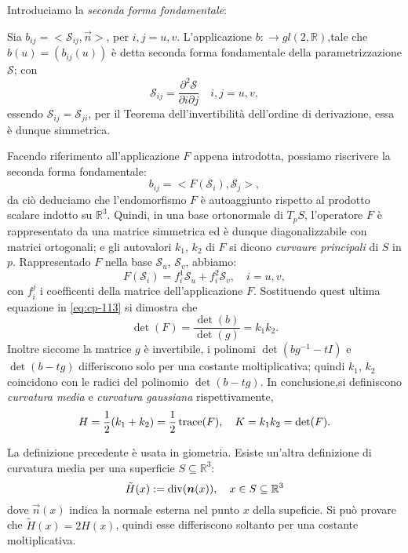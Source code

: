 Introduciamo la \emph{seconda forma fondamentale}:
\begin{definizione}
Sia $b_{ij}=<\mathcal{S}_{ij},\vec{n}>$, per $i,j=u,v$. L'applicazione $b:\longrightarrow gl(2,\mathbb{R})$,tale che $b(u)=(b_{ij}(u))$ è detta seconda forma fondamentale della parametrizzazione $\mathcal{S}$; con
\[
\mathcal{S}_{ij}=\frac{\partial^2\mathcal{S}}{\partial i\partial j}\quad i,j = u,v,
\]
essendo $\mathcal{S}_{ij}=\mathcal{S}_{ji}$, per il Teorema dell'invertibilità dell'ordine di derivazione, essa è dunque simmetrica.
\end{definizione}
Facendo riferimento all'applicazione $F$ appena introdotta, possiamo riscrivere la seconda forma fondamentale:
\begin{equation}
\label{eq:cp-113}
b_{ij}=<F(\mathcal{S}_i),\mathcal{S}_j>,
\end{equation}
da ciò deduciamo che l'endomorfismo $F$ è autoaggiunto rispetto al prodotto scalare indotto su $\mathbb{R}^3$. Quindi, in una base ortonormale di $T_pS$, l'operatore $F$ è rappresentato da una matrice simmetrica ed è dunque diagonalizzabile con matrici ortogonali; e gli autovalori $k_1$, $k_2$ di $F$ si dicono \emph{curvaure principali} di $S$ in $p$. Rappresentado $F$ nella base $\mathcal{S}_u$, $\mathcal{S}_v$, abbiamo:
\[
F(\mathcal{S}_i) = f_i^1\mathcal{S}_u + f_i^2\mathcal{S}_v,\quad i=u,v,
\]
con $f_i^j$ i coefficenti della matrice dell'applicazione $F$. Sostituendo quest ultima equazione in \eqref{eq:cp-113} si dimostra che
\[
\det(F) = \frac{\det(b)}{\det(g)}=k_1k_2.
\]
Inoltre siccome la matrice $g$ è invertibile, i polinomi $\det(bg^{-1}-tI)$ e $\det(b-tg)$ differiscono solo per una costante moltiplicativa; quindi $k_1$, $k_2$ coincidono con le radici del polinomio $\det(b-tg)$.
In conclusione,si definiscono \emph{curvatura media} e \emph{curvatura gaussiana} rispettivamente,
\[
H=\frac{1}{2}(k_1+k_2)=\frac{1}{2}\operatorname{trace}(F),\quad K=k_1k_2=\det(F).
\]
\begin{osservazione}
La definizione precedente è usata in giometria. Esiste un'altra definizione di curvatura media per una superficie $S\subseteq\mathbb{R}^3$:
\begin{equation}
  \label{eq:cp-114}
  \tilde{H}(x):= \operatorname{div}(\bm{n}(x)), \quad x\in S\subseteq\mathbb{R}^3
\end{equation}
dove $\vec{n}(x)$ indica la normale esterna nel punto $x$ della supeficie.
Si può provare che $\tilde{H}(x)=2H(x)$, quindi esse differiscono soltanto per una costante moltiplicativa.
\end{osservazione}
%
%
